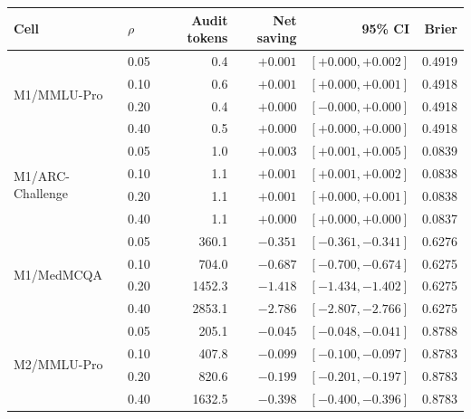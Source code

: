 \documentclass[a4paper,fleqn]{cas-sc}
\theoremstyle{plain}
\theoremstyle{definition}
\theoremstyle{remark}
\begin{document}
\begin{center}
\begin{minipage}{0.94\textwidth}
\centering

\captionsetup{
  font=footnotesize,
  skip=5pt,
  justification=justified,
  singlelinecheck=false
}

\footnotesize
\setlength{\tabcolsep}{4.6pt}
\renewcommand{\arraystretch}{0.96}

\begin{tabular}{@{}llrrrr@{}}
\toprule
Cell &
$\rho$ &
Audit tokens &
Net saving &
95\% CI &
Brier \\
\midrule

\multirow{4}{*}{M1/MMLU-Pro}
 & 0.05 & 0.4    & $+0.001$ & $[+0.000,+0.002]$ & 0.4919 \\
 & 0.10 & 0.6    & $+0.001$ & $[+0.000,+0.001]$ & 0.4918 \\
 & 0.20 & 0.4    & $+0.000$ & $[-0.000,+0.000]$ & 0.4918 \\
 & 0.40 & 0.5    & $+0.000$ & $[+0.000,+0.000]$ & 0.4918 \\

\midrule

\multirow{4}{*}{M1/ARC-Challenge}
 & 0.05 & 1.0    & $+0.003$ & $[+0.001,+0.005]$ & 0.0839 \\
 & 0.10 & 1.1    & $+0.001$ & $[+0.001,+0.002]$ & 0.0838 \\
 & 0.20 & 1.1    & $+0.001$ & $[+0.000,+0.001]$ & 0.0838 \\
 & 0.40 & 1.1    & $+0.000$ & $[+0.000,+0.000]$ & 0.0837 \\

\midrule

\multirow{4}{*}{M1/MedMCQA}
 & 0.05 & 360.1  & $-0.351$ & $[-0.361,-0.341]$ & 0.6276 \\
 & 0.10 & 704.0  & $-0.687$ & $[-0.700,-0.674]$ & 0.6275 \\
 & 0.20 & 1452.3 & $-1.418$ & $[-1.434,-1.402]$ & 0.6275 \\
 & 0.40 & 2853.1 & $-2.786$ & $[-2.807,-2.766]$ & 0.6275 \\

\midrule

\multirow{4}{*}{M2/MMLU-Pro}
 & 0.05 & 205.1  & $-0.045$ & $[-0.048,-0.041]$ & 0.8788 \\
 & 0.10 & 407.8  & $-0.099$ & $[-0.100,-0.097]$ & 0.8783 \\
 & 0.20 & 820.6  & $-0.199$ & $[-0.201,-0.197]$ & 0.8783 \\
 & 0.40 & 1632.5 & $-0.398$ & $[-0.400,-0.396]$ & 0.8783 \\


\end{tabular}
\end{minipage}
\end{center}
\end{document}
